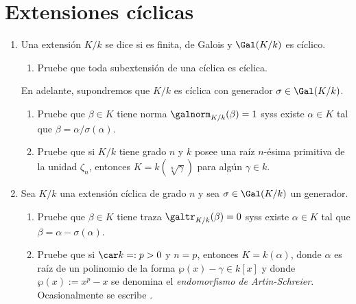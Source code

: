 \documentclass[11pt, reqno]{amsart}
\begin{document}
\section{Extensiones cíclicas}
\begin{enumerate}[resume]
	\item Una extensión $K/k$ se dice  si es finita, de Galois y $\Gal(K/k)$ es cíclico.
		\begin{enumerate}
			\item Pruebe que toda subextensión de una cíclica es cíclica.
		\end{enumerate}
		En adelante, supondremos que $K/k$ es cíclica con generador $\sigma \in \Gal(K/k)$.
		\begin{enumerate}[resume]
			\item\label{ex:mult_hilb90}
				Pruebe que $\beta \in K$ tiene norma $\galnorm_{K/k}(\beta) = 1$ syss existe $\alpha \in K$ tal que $\beta =
				\alpha/\sigma(\alpha)$.

			\item Pruebe que si $K/k$ tiene grado $n$ y $k$ posee una raíz $n$-ésima primitiva de la unidad $\zeta_n$, entonces
				$K = k(\sqrt[n]{\gamma})$ para algún $\gamma \in k$.
		\end{enumerate}

	\item Sea $K/k$ una extensión cíclica de grado $n$ y sea $\sigma \in \Gal(K/k)$ un generador.
		\begin{enumerate}
			\item\label{ex:add_hilb90}
				Pruebe que $\beta \in K$ tiene traza $\galtr_{K/k}(\beta) = 0$ syss existe $\alpha \in K$ tal que $\beta =
				\alpha - \sigma(\alpha)$.

			\item Pruebe que si $\car k =: p > 0$ y $n = p$, entonces $K = k(\alpha)$, donde $\alpha$ es raíz de un polinomio de
				la forma $\wp(x) - \gamma \in k[x]$ y donde $\wp(x) := x^p - x$ se denomina el \emph{endomorfismo de Artin-Schreier}.
				Ocasionalmente se escribe .
		\end{enumerate}
		\nocite{lang:algebra}
\end{enumerate}
\end{document}
